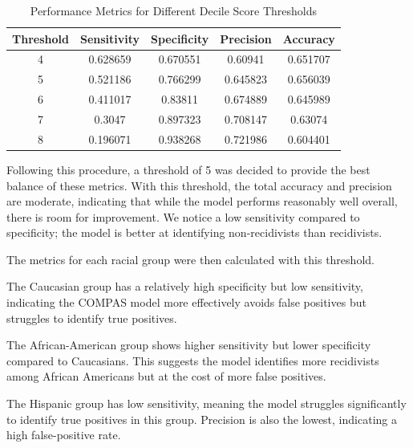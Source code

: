 \begin{table}[h!]
	\centering
	\begin{tabular}{|c|c|c|c|c|}
		\hline
		\textbf{Threshold} & \textbf{Sensitivity} & \textbf{Specificity} & \textbf{Precision} & \textbf{Accuracy} \\ \hline
		4                               & 0.628659             & 0.670551             & 0.60941            & 0.651707          \\ \hline
		5                               & 0.521186             & 0.766299             & 0.645823           & 0.656039          \\ \hline
		6                               & 0.411017             & 0.83811              & 0.674889           & 0.645989          \\ \hline
		7                               & 0.3047               & 0.897323             & 0.708147           & 0.63074           \\ \hline
		8                               & 0.196071             & 0.938268             & 0.721986           & 0.604401          \\ \hline
	\end{tabular}
	\caption{Performance Metrics for Different Decile Score Thresholds}
	\label{tab:performance_metrics}
\end{table}

Following this procedure, a threshold of 5 was decided to provide the best balance of these metrics. With this threshold, the total accuracy and precision are moderate, indicating that while the model performs reasonably well overall, there is room for improvement. We notice a low sensitivity compared to specificity; the model is better at identifying non-recidivists than recidivists.


The metrics for each racial group were then calculated with this threshold.


The Caucasian group has a relatively high specificity but low sensitivity, indicating the COMPAS model more effectively avoids false positives but struggles to identify true positives. 

The African-American group shows higher sensitivity but lower specificity compared to Caucasians. This suggests the model identifies more recidivists among African Americans but at the cost of more false positives.


The Hispanic group has low sensitivity, meaning the model struggles significantly to identify true positives in this group. Precision is also the lowest, indicating a high false-positive rate.


